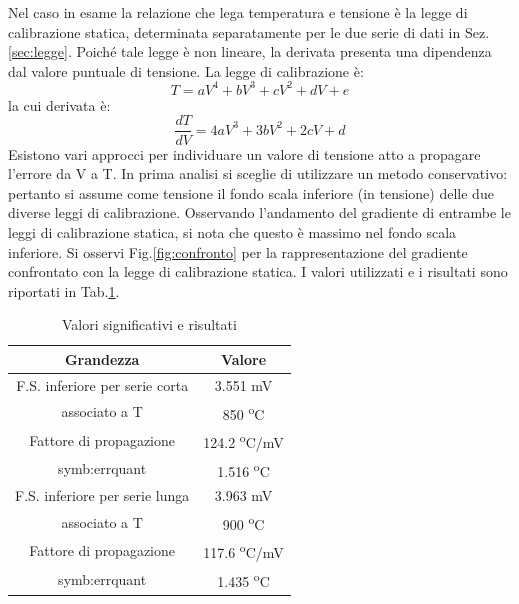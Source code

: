Nel caso in esame la relazione che lega temperatura e tensione è la legge di calibrazione statica, determinata separatamente per le due serie di dati in Sez.\ref{sec:legge}. Poiché tale legge è non lineare, la derivata presenta una dipendenza dal valore puntuale di tensione. La legge di calibrazione è:
\begin{equation}
	T = aV^4 + bV^3+cV^2+dV+e
\end{equation}
la cui derivata è: 
\begin{equation}
	\frac{dT}{dV} = 4aV^3+3bV^2+2cV+d
\end{equation}
Esistono vari approcci per individuare un valore di tensione atto a propagare l'errore da V a T. In prima analisi si sceglie di utilizzare un metodo conservativo: pertanto si assume come tensione il fondo scala inferiore (in tensione) delle due diverse leggi di calibrazione. Osservando l'andamento del gradiente di entrambe le leggi di calibrazione statica, si nota che questo è massimo nel fondo scala inferiore. Si osservi Fig.\ref{fig:confronto} per la rappresentazione del gradiente confrontato con la legge di calibrazione statica. 
I valori utilizzati e i risultati sono riportati in Tab.\ref{tab:valorierisultati}.
\begin{table}[H]
\centering
\begin{tabular}{c|c}
	\toprule
	\toprule
	\textbf{Grandezza} & \textbf{Valore} \\
	\midrule
	F.S. inferiore per serie corta & 3.551 mV\\
	associato a T & 850 \textsuperscript{o}C\\
	\midrule
	Fattore di propagazione & 124.2 \textsuperscript{o}C/mV\\
	\midrule
	\gls{symb:errquant} & 1.516 \textsuperscript{o}C\\
	\midrule
	\midrule
	F.S. inferiore per serie lunga & 3.963 mV\\
	associato a T & 900 \textsuperscript{o}C\\
	\midrule
	Fattore di propagazione & 117.6 \textsuperscript{o}C/mV\\
	\midrule
	\gls{symb:errquant} & 1.435 \textsuperscript{o}C\\
	
	\bottomrule
	\bottomrule
\end{tabular}
\caption{Valori significativi e risultati}
\label{tab:valorierisultati}
\end{table}


